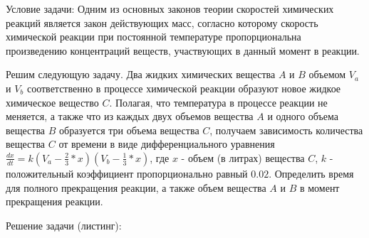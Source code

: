 Условие задачи: Одним из основных законов теории скоростей химических реакций является закон действующих масс, согласно которому скорость химической реакции при постоянной температуре пропорциональна произведению концентраций веществ, участвующих в данный момент в реакции.

Решим следующую задачу. Два жидких химических вещества $A$ и $B$ объемом $V_{a}$ и $V_{b}$ соответственно в процессе химической реакции образуют новое жидкое химическое вещество $C$. Полагая, что температура в процессе реакции не меняется, а также что из каждых двух объемов вещества $A$ и одного объема вещества $B$ образуется три объема вещества $C$, получаем зависимость количества вещества $C$ от времени в виде дифференциального уравнения $\frac{dx}{dt} = k (V_{a} - \frac{2}{3} * x)(V_{b} - \frac{1}{3} * x)$, где $x$ - объем (в литрах) вещества $C$, $k$ - положительный коэффициент пропорционально равный $0.02$. Определить время для полного прекращения реакции, а также объем вещества $A$ и $B$ в момент прекращения реакции.

Решение задачи (листинг):

